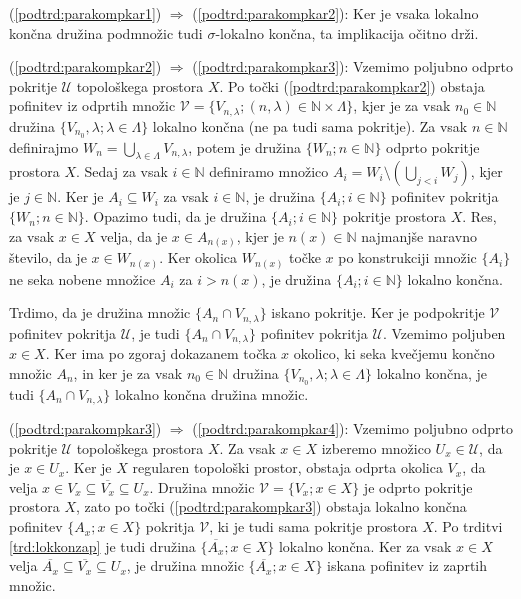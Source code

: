 \documentclass[mat1]{fmfdelo}
\newcommand{\N}{\mathbb N}
\newcommand{\Ucurl}{\mathcal{U}}
\newcommand{\closure}[1]{\overline{#1}}
\begin{document}
\begin{dokaz}
(\ref{podtrd:parakompkar1}) $\Rightarrow$ (\ref{podtrd:parakompkar2}):
Ker je vsaka lokalno končna družina podmnožic tudi $\sigma$-lokalno končna, ta implikacija očitno drži.

(\ref{podtrd:parakompkar2}) $\Rightarrow$ (\ref{podtrd:parakompkar3}):
Vzemimo poljubno odprto pokritje $\Ucurl$ topološkega prostora $X$. Po točki (\ref{podtrd:parakompkar2}) obstaja pofinitev iz odprtih množic $\mathcal{V} = \lbrace V_{n,\lambda} ; (n, \lambda) \in \N \times \Lambda \rbrace$, kjer je za vsak $n_0 \in \N$ družina $\lbrace V_{n_0}, \lambda ; \lambda \in \Lambda\rbrace$ lokalno končna (ne pa tudi sama pokritje). Za vsak $n \in \N$ definirajmo $W_n = \bigcup_{\lambda \in \Lambda} V_{n, \lambda}$, potem je družina $\lbrace W_n ; n \in \N \rbrace$ odprto pokritje prostora $X$. Sedaj za vsak $i \in \N$ definiramo množico $A_i = W_i \setminus (\bigcup_{j<i}W_j)$, kjer je $j \in \N$. Ker je $A_i \subseteq W_i$ za vsak $i \in \N$, je družina $\lbrace A_i ; i \in \N \rbrace$ pofinitev pokritja $\lbrace W_n ; n \in \N \rbrace$. Opazimo tudi, da je družina $\lbrace A_i ; i \in \N \rbrace$ pokritje prostora $X$. Res, za vsak $x \in X$ velja, da je $x \in A_{n(x)}$, kjer je $n(x) \in \N$ najmanjše naravno število, da je $x \in W_{n(x)}$. Ker okolica $W_{n(x)}$ točke $x$ po konstrukciji množic $\lbrace A_i \rbrace$ ne seka nobene množice $A_i$ za $i > n(x)$, je družina $\lbrace A_i ; i \in \N \rbrace$ lokalno končna.

Trdimo, da je družina množic $\lbrace A_n \cap V_{n, \lambda}\rbrace$ iskano pokritje. Ker je podpokritje $\mathcal{V}$ pofinitev pokritja $\Ucurl$, je tudi $\lbrace A_n \cap V_{n, \lambda}\rbrace$ pofinitev pokritja $\Ucurl$. Vzemimo poljuben $x \in X$. Ker ima po zgoraj dokazanem točka $x$ okolico, ki seka kvečjemu končno množic $A_n$, in ker je za vsak $n_0 \in \N$ družina $\lbrace V_{n_0}, \lambda ; \lambda \in \Lambda \rbrace$ lokalno končna, je tudi $\lbrace A_n \cap V_{n, \lambda}\rbrace$ lokalno končna družina množic.

(\ref{podtrd:parakompkar3}) $\Rightarrow$ (\ref{podtrd:parakompkar4}):
Vzemimo poljubno odprto pokritje $\Ucurl$ topološkega prostora $X$. Za vsak $x \in X$ izberemo množico $U_x \in \Ucurl$, da je $x \in U_x$. Ker je $X$ regularen topološki prostor, obstaja odprta okolica $V_x$, da velja $x \in V_x \subseteq \closure{V_x} \subseteq U_x$. Družina množic $\mathcal{V} = \lbrace V_x ; x \in X \rbrace$ je odprto pokritje prostora $X$, zato po točki (\ref{podtrd:parakompkar3}) obstaja lokalno končna pofinitev $\lbrace A_x ; x \in X \rbrace$ pokritja $\mathcal{V}$, ki je tudi sama pokritje prostora $X$. Po trditvi \ref{trd:lokkonzap} je tudi družina $\lbrace \closure{A_x} ; x \in X \rbrace$ lokalno končna. Ker za vsak $x \in X$ velja $\closure{A_x} \subseteq \closure{V_x} \subseteq U_x$, je družina množic $\lbrace \closure{A_x} ; x \in X \rbrace$ iskana pofinitev iz zaprtih množic.


\end{dokaz}
\end{document}
